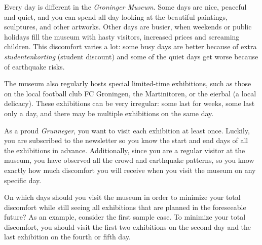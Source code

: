 





Every day is different in the \emph{Groninger Museum}.
Some days are nice, peaceful and quiet,
and you can spend all day looking at the beautiful paintings, sculptures, and other artworks.
Other days are busier,
when weekends or public holidays fill the museum with hasty visitors, increased prices and screaming children.
This discomfort varies a lot:
some busy days are better because of extra \emph{studentenkorting} (student discount)
and some of the quiet days get worse because of earthquake risks.

The museum also regularly hosts special limited-time exhibitions,
such as those on the local football club FC Groningen, the Martinitoren, or the eierbal (a local delicacy).
These exhibitions can be very irregular:
some last for weeks, some last only a day, and there may be multiple exhibitions on the same day.

As a proud \emph{Grunneger}, you want to visit each exhibition at least once.
Luckily, you are subscribed to the newsletter so you know the start and end days of all the exhibitions in advance.
Additionally, since you are a regular visitor at the museum, you have observed all the crowd and earthquake patterns,
so you know exactly how much discomfort you will receive when you visit the museum on any specific day.

On which days should you visit the museum in order to minimize your total discomfort
while still seeing all exhibitions that are planned in the foreseeable future?
As an example, consider the first sample case.
To minimize your total discomfort,
you should visit the first two exhibitions on the second day
and the last exhibition on the fourth or fifth day.

